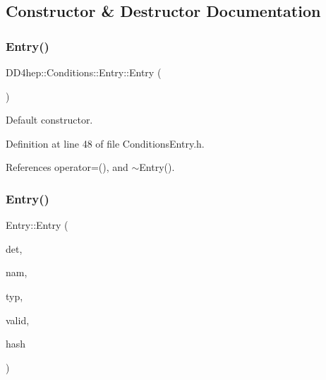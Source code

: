 \subsection{Constructor \& Destructor Documentation}
\hypertarget{class_d_d4hep_1_1_conditions_1_1_entry_a31e26e63b90fd0bb0d2772e5614f8afd}{}\label{class_d_d4hep_1_1_conditions_1_1_entry_a31e26e63b90fd0bb0d2772e5614f8afd} 
\subsubsection{\texorpdfstring{Entry()}{Entry()}\hspace{0.1cm}{\footnotesize\ttfamily [1/3]}}
{\footnotesize\ttfamily D\+D4hep\+::\+Conditions\+::\+Entry\+::\+Entry (\begin{DoxyParamCaption}{ }\end{DoxyParamCaption})\hspace{0.3cm}{\ttfamily [inline]}}



Default constructor. 



Definition at line 48 of file Conditions\+Entry.\+h.



References operator=(), and $\sim$\+Entry().

\hypertarget{class_d_d4hep_1_1_conditions_1_1_entry_a73a537f284df0ad72a02913e7d938baa}{}\label{class_d_d4hep_1_1_conditions_1_1_entry_a73a537f284df0ad72a02913e7d938baa} 
\subsubsection{\texorpdfstring{Entry()}{Entry()}\hspace{0.1cm}{\footnotesize\ttfamily [2/3]}}
{\footnotesize\ttfamily Entry\+::\+Entry (\begin{DoxyParamCaption}\item[{const \hyperlink{class_d_d4hep_1_1_geometry_1_1_det_element}{Geometry\+::\+Det\+Element} \&}]{det,  }\item[{const std\+::string \&}]{nam,  }\item[{const std\+::string \&}]{typ,  }\item[{const std\+::string \&}]{valid,  }\item[{int}]{hash }\end{DoxyParamCaption})}



